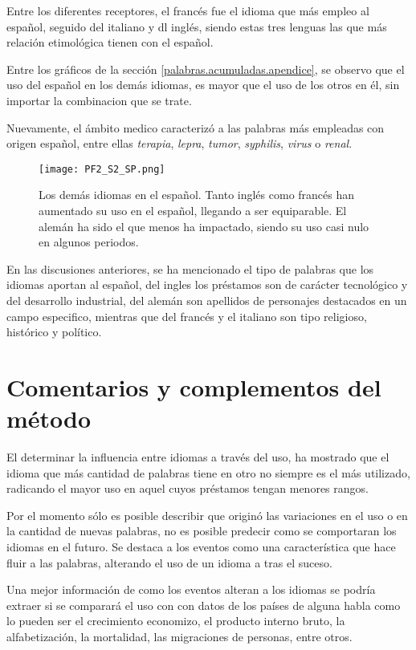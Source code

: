 Entre los diferentes receptores, el francés fue el idioma que más empleo al español, seguido del italiano y dl inglés, siendo estas tres lenguas las que más relación etimológica tienen con el español.  

Entre los gráficos de la sección \ref{palabras.acumuladas.apendice}, se observo que el uso del español en los demás idiomas, es mayor que el uso de los otros en él, sin importar la combinacion que se trate.

Nuevamente,  el ámbito medico caracterizó a las palabras más empleadas con origen español, entre ellas \textit{terapia}, \textit{lepra}, \textit{tumor}, \textit{syphilis}, \textit{virus} o \textit{renal}. 

		
\begin{figure}[h!] %
	\centering
	\texttt{[image: PF2\_S2\_SP.png]}
	\label{fig.ST_b_SP}
	\caption{Los demás idiomas en el español.  Tanto inglés como francés han aumentado su uso  en el español, llegando a ser equiparable. El alemán ha sido el que menos ha impactado, siendo su uso casi nulo en  algunos periodos.}
\end{figure}


En las discusiones anteriores, se ha mencionado el tipo de palabras que los idiomas aportan al español, del ingles los préstamos son de carácter tecnológico y del desarrollo industrial, del alemán son apellidos de personajes destacados en un campo especifico, mientras que del francés y el italiano son tipo religioso, histórico y político. 






\section{Comentarios y complementos del método} %


El determinar la influencia entre idiomas a través del uso, ha mostrado que el idioma que más cantidad de palabras tiene en otro no siempre es el más utilizado, radicando el mayor uso en aquel cuyos préstamos tengan menores rangos. 

Por el momento sólo es posible describir que originó las variaciones en el uso o en la cantidad de nuevas palabras, no es posible predecir como se comportaran los idiomas en el futuro. Se destaca a los eventos como una característica que  hace fluir a las palabras, alterando el uso de un idioma a tras el suceso. 

Una mejor información de como los eventos alteran a los idiomas se podría extraer si se comparará el uso con con  datos de los países de alguna habla como lo pueden ser  el crecimiento economizo, el producto interno bruto, la alfabetización, la mortalidad, las migraciones de personas, entre otros. 

